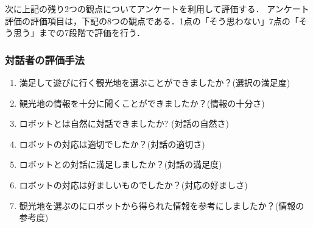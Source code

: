 次に上記の残り2つの観点についてアンケートを利用して評価する．
アンケート評価の評価項目は，下記の8つの観点である．1点の「そう思わない」7点の「そう思う」までの7段階で評価を行う．
\subsubsection{対話者の評価手法}
\begin{enumerate}
    \item 満足して遊びに行く観光地を選ぶことができましたか？(選択の満足度)
    \item 観光地の情報を十分に聞くことができましたか？(情報の十分さ)
    \item ロボットとは自然に対話できましたか? (対話の自然さ)
    \item ロボットの対応は適切でしたか？(対話の適切さ)
    \item ロボットとの対話に満足しましたか？(対話の満足度)
    \item ロボットの対応は好ましいものでしたか？(対応の好ましさ)
    \item 観光地を選ぶのにロボットから得られた情報を参考にしましたか？(情報の参考度)
\end{enumerate}

